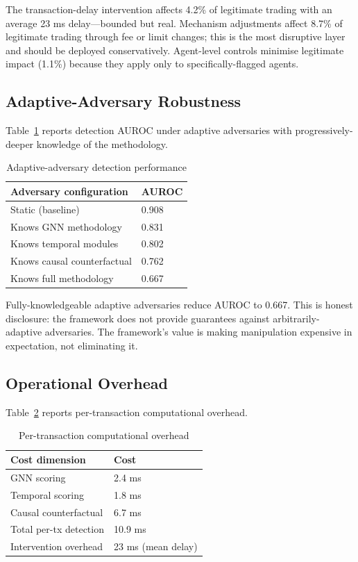\documentclass[sigconf,nonacm]{acmart}
\begin{document}
The transaction-delay intervention affects 4.2\% of legitimate
trading with an average 23 ms delay---bounded but real. Mechanism
adjustments affect 8.7\% of legitimate trading through fee or
limit changes; this is the most disruptive layer and should be
deployed conservatively. Agent-level controls minimise legitimate
impact (1.1\%) because they apply only to specifically-flagged
agents.

\subsection{Adaptive-Adversary Robustness}

Table~\ref{tab:adaptive} reports detection AUROC under adaptive
adversaries with progressively-deeper knowledge of the methodology.

\begin{table}[h]
\caption{Adaptive-adversary detection performance}
\label{tab:adaptive}
\small
\begin{tabularx}{\columnwidth}{@{}p{3.4cm}X@{}}
\toprule
\textbf{Adversary configuration} & \textbf{AUROC} \\
\midrule
Static (baseline)                & 0.908 \\
Knows GNN methodology            & 0.831 \\
Knows temporal modules           & 0.802 \\
Knows causal counterfactual      & 0.762 \\
Knows full methodology           & 0.667 \\
\bottomrule
\end{tabularx}
\end{table}

Fully-knowledgeable adaptive adversaries reduce AUROC to 0.667.
This is honest disclosure: the framework does not provide
guarantees against arbitrarily-adaptive adversaries. The
framework's value is making manipulation expensive in
expectation, not eliminating it.

\subsection{Operational Overhead}

Table~\ref{tab:overhead} reports per-transaction computational
overhead.

\begin{table}[h]
\caption{Per-transaction computational overhead}
\label{tab:overhead}
\small
\begin{tabularx}{\columnwidth}{@{}p{3.4cm}X@{}}
\toprule
\textbf{Cost dimension} & \textbf{Cost} \\
\midrule
GNN scoring              & 2.4 ms \\
Temporal scoring         & 1.8 ms \\
Causal counterfactual    & 6.7 ms \\
Total per-tx detection   & 10.9 ms \\
Intervention overhead    & 23 ms (mean delay) \\
\bottomrule
\end{tabularx}
\end{table}
\end{document}
